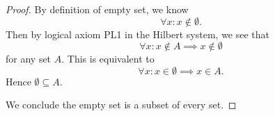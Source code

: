 \begin{Exercise}
	\begin{proof}
		By definition of empty set, we know
		$$
		\forall x: x\notin \emptyset.
		$$
		Then by logical axiom PL1 in the Hilbert system, we see that
		$$
		\forall x: x\notin A \implies x\notin \emptyset
		$$
		for any set $A$. 
		This is equivalent to
		$$
		\forall x: x\in \emptyset \implies x\in A.
		$$
		Hence $\emptyset \subseteq A$.
		
		We conclude the empty set is a subset of every set.
	\end{proof}
\end{Exercise}